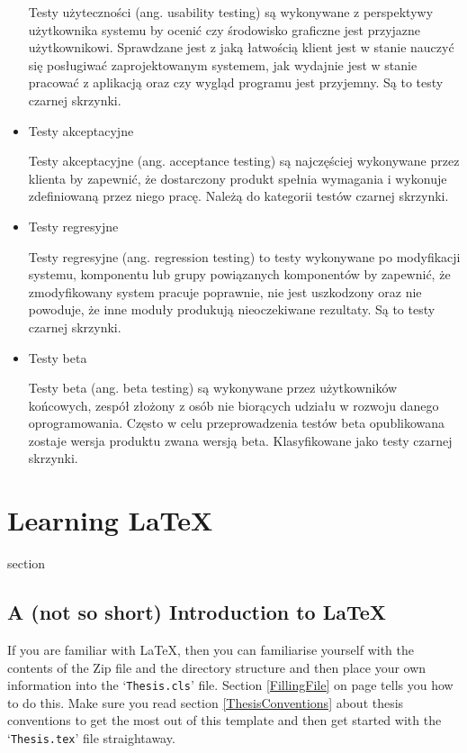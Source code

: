 \begin{itemize}
Testy użyteczności (ang. usability testing) są wykonywane z perspektywy użytkownika systemu by ocenić czy środowisko graficzne jest przyjazne użytkownikowi. Sprawdzane jest z jaką łatwością klient jest w stanie nauczyć się posługiwać zaprojektowanym systemem, jak wydajnie jest w stanie pracować z aplikacją oraz czy wygląd programu jest przyjemny. Są to testy czarnej skrzynki.

\item
Testy akceptacyjne

Testy akceptacyjne (ang. acceptance testing) są najczęściej wykonywane przez klienta by zapewnić, że dostarczony produkt spełnia wymagania i wykonuje zdefiniowaną przez niego pracę. Należą do kategorii testów czarnej skrzynki.

\item
Testy regresyjne

Testy regresyjne (ang. regression testing) to testy wykonywane po modyfikacji systemu, komponentu lub grupy powiązanych komponentów by zapewnić, że zmodyfikowany system pracuje poprawnie, nie jest uszkodzony oraz nie powoduje, że inne moduły produkują nieoczekiwane rezultaty. Są to testy czarnej skrzynki.

\item
Testy beta

Testy beta (ang. beta testing) są wykonywane przez użytkowników końcowych, zespół złożony z osób nie biorących udziału w rozwoju danego oprogramowania. Często w celu przeprowadzenia testów beta opublikowana zostaje wersja produktu zwana wersją beta. Klasyfikowane jako testy czarnej skrzynki.
\end{itemize}

\section{Learning \LaTeX{}}

section

\subsection{A (not so short) Introduction to \LaTeX{}}

If you are familiar with \LaTeX{}, then you can familiarise yourself with the contents of the Zip file and the directory structure and then place your own information into the `\texttt{Thesis.cls}' file. Section \ref{FillingFile} on page \pageref{FillingFile} tells you how to do this. Make sure you read section \ref{ThesisConventions} about thesis conventions to get the most out of this template and then get started with the `\texttt{Thesis.tex}' file straightaway.

